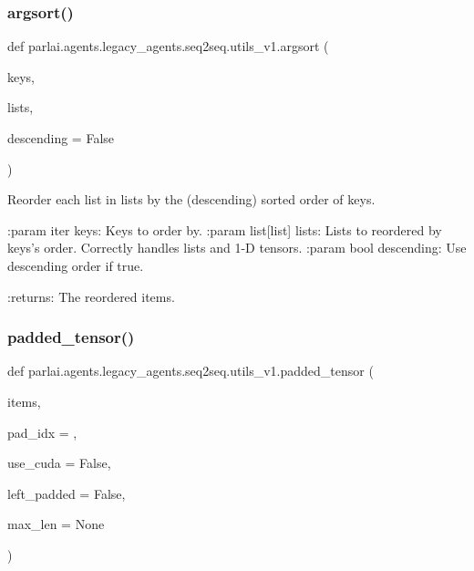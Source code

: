 \subsubsection{\texorpdfstring{argsort()}{argsort()}}
{\footnotesize\ttfamily def parlai.\+agents.\+legacy\+\_\+agents.\+seq2seq.\+utils\+\_\+v1.\+argsort (\begin{DoxyParamCaption}\item[{}]{keys,  }\item[{}]{lists,  }\item[{}]{descending = {\ttfamily False} }\end{DoxyParamCaption})}

\begin{DoxyVerb}Reorder each list in lists by the (descending) sorted order of keys.

:param iter keys: Keys to order by.
:param list[list] lists: Lists to reordered by keys's order.
                         Correctly handles lists and 1-D tensors.
:param bool descending: Use descending order if true.

:returns: The reordered items.
\end{DoxyVerb}
 \mbox{\label{namespaceparlai_1_1agents_1_1legacy__agents_1_1seq2seq_1_1utils__v1_adb5a414ae439f14c54e8c760b91cc4c8}} 
\subsubsection{\texorpdfstring{padded\+\_\+tensor()}{padded\_tensor()}}
{\footnotesize\ttfamily def parlai.\+agents.\+legacy\+\_\+agents.\+seq2seq.\+utils\+\_\+v1.\+padded\+\_\+tensor (\begin{DoxyParamCaption}\item[{}]{items,  }\item[{}]{pad\+\_\+idx = {},  }\item[{}]{use\+\_\+cuda = {\ttfamily False},  }\item[{}]{left\+\_\+padded = {\ttfamily False},  }\item[{}]{max\+\_\+len = {\ttfamily None} }\end{DoxyParamCaption})}

